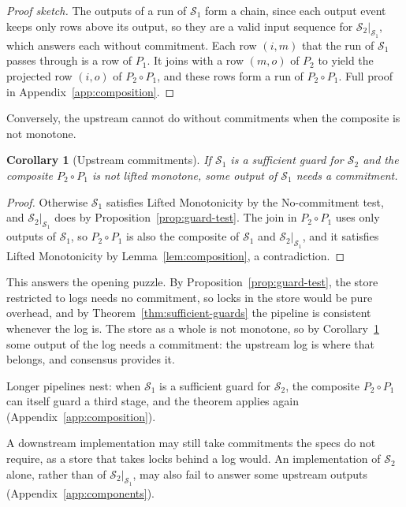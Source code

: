 \documentclass[sigconf]{cidr-2027}
\newtheorem{corollary}{Corollary}
\theoremstyle{remark}
\newcommand{\commitment}{commitment\xspace}
\newcommand{\commitments}{commitments\xspace}
\newcommand{\Spec}{\mathcal{S}}
\begin{document}
\begin{proof}[Proof sketch]
The outputs of a run of $\Spec_1$ form a chain, since each output event keeps
only rows above its output, so they are a valid input sequence for
$\Spec_2|_{\Spec_1}$, which answers each without \commitment. Each row
$(i,m)$ that the run of $\Spec_1$ passes through is a row of $P_1$. It joins
with a row $(m,o)$ of $P_2$ to yield the projected row $(i,o)$ of
$P_2\circ P_1$, and these rows form a run of $P_2\circ P_1$. Full proof in
Appendix~\ref{app:composition}.
\end{proof}

Conversely, the upstream cannot do without \commitments when the composite is
not monotone.

\begin{corollary}[Upstream \commitments]
\label{cor:upstream-commitments}
\textcolor{reviewed}{If $\Spec_1$ is a sufficient guard for $\Spec_2$ and the composite
$P_2\circ P_1$ is not lifted monotone, some output of $\Spec_1$ needs a
\commitment.}
\end{corollary}

\begin{proof}
Otherwise $\Spec_1$ satisfies Lifted Monotonicity by the No-\commitment test,
and $\Spec_2|_{\Spec_1}$ does by Proposition~\ref{prop:guard-test}. The join
in $P_2\circ P_1$ uses only outputs of $\Spec_1$, so $P_2\circ P_1$ is also the
composite of $\Spec_1$ and $\Spec_2|_{\Spec_1}$, and it satisfies Lifted
Monotonicity by Lemma~\ref{lem:composition}, a contradiction.
\end{proof}

\textcolor{reviewed}{This answers the opening puzzle.} By Proposition~\ref{prop:guard-test}, the
store restricted to logs needs no \commitment, so locks in the store would be
pure overhead, and by Theorem~\ref{thm:sufficient-guards} the pipeline is
consistent whenever the log is. The store as a whole is not monotone, so by
Corollary~\ref{cor:upstream-commitments} some output of the log needs a
\commitment: the upstream log is where that belongs, and consensus provides
it.

Longer pipelines nest: when $\Spec_1$ is a sufficient guard for $\Spec_2$,
the composite $P_2\circ P_1$ can itself guard a third stage, and the theorem applies again
(Appendix~\ref{app:composition}).

A downstream implementation may still take \commitments the specs do not
require, as a store that takes locks behind a log would. An implementation of
$\Spec_2$ alone, rather than of $\Spec_2|_{\Spec_1}$, may also fail to answer
some upstream outputs (Appendix~\ref{app:components}).
\end{document}
